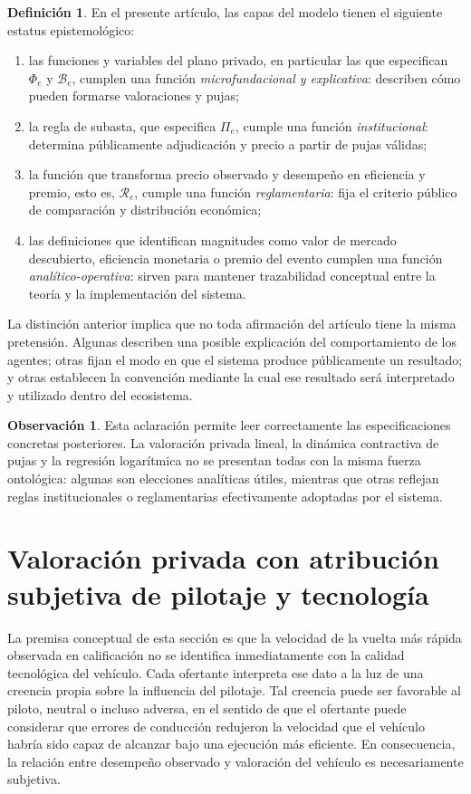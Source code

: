 \documentclass[11pt,a4paper]{article}
\theoremstyle{definition}
\newtheorem{definicion}{Definición}
\newtheorem{observacion}{Observación}
\begin{document}
\begin{definicion}
En el presente artículo, las capas del modelo tienen el siguiente estatus epistemológico:
\begin{enumerate}
    \item las funciones y variables del plano privado, en particular las que especifican $\Phi_e$ y $\mathcal B_e$, cumplen una función \emph{microfundacional y explicativa}: describen cómo pueden formarse valoraciones y pujas;
    \item la regla de subasta, que especifica $\Pi_e$, cumple una función \emph{institucional}: determina públicamente adjudicación y precio a partir de pujas válidas;
    \item la función que transforma precio observado y desempeño en eficiencia y premio, esto es, $\mathcal R_e$, cumple una función \emph{reglamentaria}: fija el criterio público de comparación y distribución económica;
    \item las definiciones que identifican magnitudes como valor de mercado descubierto, eficiencia monetaria o premio del evento cumplen una función \emph{analítico-operativa}: sirven para mantener trazabilidad conceptual entre la teoría y la implementación del sistema.
\end{enumerate}
\end{definicion}

La distinción anterior implica que no toda afirmación del artículo tiene la misma pretensión. Algunas describen una posible explicación del comportamiento de los agentes; otras fijan el modo en que el sistema produce públicamente un resultado; y otras establecen la convención mediante la cual ese resultado será interpretado y utilizado dentro del ecosistema.

\begin{observacion}
Esta aclaración permite leer correctamente las especificaciones concretas posteriores. La valoración privada lineal, la dinámica contractiva de pujas y la regresión logarítmica no se presentan todas con la misma fuerza ontológica: algunas son elecciones analíticas útiles, mientras que otras reflejan reglas institucionales o reglamentarias efectivamente adoptadas por el sistema.
\end{observacion}
\section{Valoración privada con atribución subjetiva de pilotaje y tecnología}

La premisa conceptual de esta sección es que la velocidad de la vuelta más rápida observada en calificación no se identifica inmediatamente con la calidad tecnológica del vehículo. Cada ofertante interpreta ese dato a la luz de una creencia propia sobre la influencia del pilotaje. Tal creencia puede ser favorable al piloto, neutral o incluso adversa, en el sentido de que el ofertante puede considerar que errores de conducción redujeron la velocidad que el vehículo habría sido capaz de alcanzar bajo una ejecución más eficiente. En consecuencia, la relación entre desempeño observado y valoración del vehículo es necesariamente subjetiva.
\end{document}
